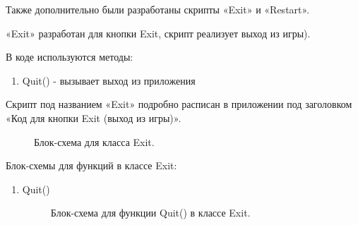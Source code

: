 \documentclass[14pt, oneside]{altsu-report}
\begin{document}
Также дополнительно были разработаны скрипты «Exit» и «Restart».

«Exit» разработан для кнопки Exit, скрипт реализует выход из игры).

В коде используются методы:

\begin{enumerate}
\item Quit() - вызывает выход из приложения
\end{enumerate} 

Скрипт под названием «Exit» подробно расписан в приложении под заголовком «Код для кнопки Exit (выход из игры)».

\begin{figure}[H]
\caption{Блок-схема для класса Exit.}
\end{figure}

Блок-схемы для функций в классе Exit:
\begin{enumerate}
\item Quit()

\begin{figure}[H]
\caption{Блок-схема для функции  Quit() в классе Exit.}
\end{figure}

\end{enumerate}
\end{document}
